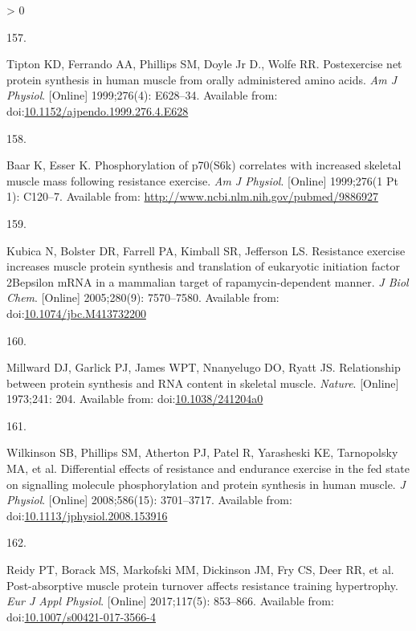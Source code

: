 \documentclass[twoside,10pt]{gihclass} %
\newlength{\cslhangindent}
\newlength{\csllabelwidth}
\newenvironment{CSLReferences}[3] %
 {%
  \setlength{\parindent}{0pt}
  \ifodd #1 \everypar{\setlength{\hangindent}{\cslhangindent}}\ignorespaces\fi
  \ifnum #2 > 0
  \setlength{\parskip}{#2\baselineskip}
  \fi
 }%
 {}
\newcommand{\CSLLeftMargin}[1]{\parbox[t]{\maxof{\widthof{#1}}{\csllabelwidth}}{#1}}
\newcommand{\CSLRightInline}[1]{\parbox[t]{\linewidth}{#1}}
\begin{document}
\begin{CSLReferences}{0}{0}
\leavevmode\hypertarget{ref-RN2715}{}%
\CSLLeftMargin{157. }
\CSLRightInline{Tipton KD, Ferrando AA, Phillips SM, Doyle Jr D., Wolfe RR. Postexercise net protein synthesis in human muscle from orally administered amino acids. \emph{Am J Physiol}. {[}Online{]} 1999;276(4): E628--34. Available from: doi:\href{https://doi.org/10.1152/ajpendo.1999.276.4.E628}{10.1152/ajpendo.1999.276.4.E628}}

\leavevmode\hypertarget{ref-RN866}{}%
\CSLLeftMargin{158. }
\CSLRightInline{Baar K, Esser K. Phosphorylation of p70(S6k) correlates with increased skeletal muscle mass following resistance exercise. \emph{Am J Physiol}. {[}Online{]} 1999;276(1 Pt 1): C120--7. Available from: \url{http://www.ncbi.nlm.nih.gov/pubmed/9886927}}

\leavevmode\hypertarget{ref-RN860}{}%
\CSLLeftMargin{159. }
\CSLRightInline{Kubica N, Bolster DR, Farrell PA, Kimball SR, Jefferson LS. Resistance exercise increases muscle protein synthesis and translation of eukaryotic initiation factor 2Bepsilon mRNA in a mammalian target of rapamycin-dependent manner. \emph{J Biol Chem}. {[}Online{]} 2005;280(9): 7570--7580. Available from: doi:\href{https://doi.org/10.1074/jbc.M413732200}{10.1074/jbc.M413732200}}

\leavevmode\hypertarget{ref-RN2145}{}%
\CSLLeftMargin{160. }
\CSLRightInline{Millward DJ, Garlick PJ, James WPT, Nnanyelugo DO, Ryatt JS. Relationship between protein synthesis and RNA content in skeletal muscle. \emph{Nature}. {[}Online{]} 1973;241: 204. Available from: doi:\href{https://doi.org/10.1038/241204a0}{10.1038/241204a0}}

\leavevmode\hypertarget{ref-RN1866}{}%
\CSLLeftMargin{161. }
\CSLRightInline{Wilkinson SB, Phillips SM, Atherton PJ, Patel R, Yarasheski KE, Tarnopolsky MA, et al. Differential effects of resistance and endurance exercise in the fed state on signalling molecule phosphorylation and protein synthesis in human muscle. \emph{J Physiol}. {[}Online{]} 2008;586(15): 3701--3717. Available from: doi:\href{https://doi.org/10.1113/jphysiol.2008.153916}{10.1113/jphysiol.2008.153916}}

\leavevmode\hypertarget{ref-RN1897}{}%
\CSLLeftMargin{162. }
\CSLRightInline{Reidy PT, Borack MS, Markofski MM, Dickinson JM, Fry CS, Deer RR, et al. Post-absorptive muscle protein turnover affects resistance training hypertrophy. \emph{Eur J Appl Physiol}. {[}Online{]} 2017;117(5): 853--866. Available from: doi:\href{https://doi.org/10.1007/s00421-017-3566-4}{10.1007/s00421-017-3566-4}}


\end{CSLReferences}
\end{document}
